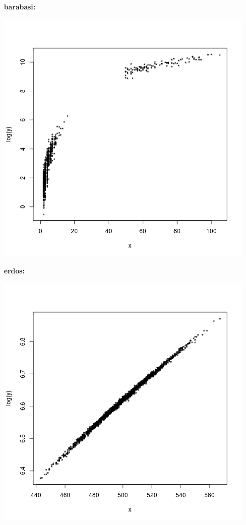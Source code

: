 \documentclass[palatino,nochap]{apuntes}
\begin{document}
\textbf{barabasi:}

\begin{center}
	\includegraphics[scale=0.45]{img/barabasi_grado-betweeness}
\end{center}


\textbf{erdos:}

\begin{center}
	\includegraphics[scale=0.45]{img/erdos_grado-betweeness}
\end{center}
\end{document}
